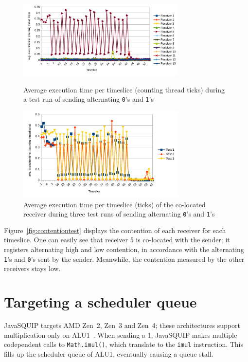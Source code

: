 \documentclass[11pt,
  titlepage=false,
  parskip=half,      %
]{scrreprt}
\begin{document}
\begin{figure}
    \centering
    \includegraphics[width=0.75\textwidth]{figures/contentiontest}

    \caption{Average execution time per timeslice (counting thread ticks) during a test run of sending alternating \texttt{0}'s and \texttt{1}'s}
    \label{fig:contentiontest}
    \centering
    \includegraphics[width=0.75\textwidth]{figures/contentioncoalesced}

    \caption{Average execution time per timeslice (ticks) of the co-located receiver during three test runs of sending alternating \texttt{0}'s and \texttt{1}'s}
    \label{fig:contentioncoalesced}
\end{figure}

Figure~\ref{fig:contentiontest} displays the contention of each receiver for each timeslice.
One can easily see that receiver 5 is co-located with the sender;
it registers alternating high and low contention, in accordance with the alternating \texttt{1}'s and \texttt{0}'s sent by the sender.
Meanwhile, the contention measured by the other receivers stays low.

\section{Targeting a scheduler queue}
JavaSQUIP targets AMD Zen~2, Zen~3 and Zen~4;
these architectures support multiplication only on ALU1~\cite{AMD2020OptimizationEPYC7003}.
When sending a 1, JavaSQUIP makes multiple codependent calls to \texttt{Math.imul()}, which translate to the \texttt{imul} instruction.
This fills up the scheduler queue of ALU1, eventually causing a queue stall.
\end{document}
